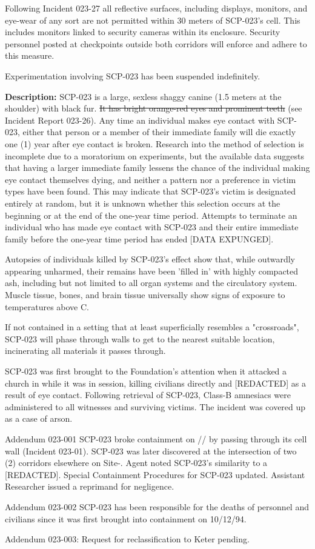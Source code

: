 Following Incident 023-27 all reflective surfaces, including displays, monitors, and eye-wear of any sort are not permitted within 30 meters of SCP-023's cell. This includes monitors linked to security cameras within its enclosure. Security personnel posted at checkpoints outside both corridors will enforce and adhere to this measure.

Experimentation involving SCP-023 has been suspended indefinitely.

\textbf{Description:} SCP-023 is a large, sexless shaggy canine (1.5 meters at the shoulder) with black fur. \sout{It has bright orange-red eyes and prominent teeth} (see Incident Report 023-26). Any time an individual makes eye contact with SCP-023, either that person or a member of their immediate family will die exactly one (1) year after eye contact is broken. Research into the method of selection is incomplete due to a moratorium on experiments, but the available data suggests that having a larger immediate family lessens the chance of the individual making eye contact themselves dying, and neither a pattern nor a preference in victim types have been found. This may indicate that SCP-023's victim is designated entirely at random, but it is unknown whether this selection occurs at the beginning or at the end of the one-year time period. Attempts to terminate an individual who has made eye contact with SCP-023 and their entire immediate family before the one-year time period has ended [DATA EXPUNGED].

Autopsies of individuals killed by SCP-023's effect show that, while outwardly appearing unharmed, their remains have been 'filled in' with highly compacted ash, including but not limited to all organ systems and the circulatory system. Muscle tissue, bones, and brain tissue universally show signs of exposure to temperatures above \degree C.

If not contained in a setting that at least superficially resembles a "crossroads", SCP-023 will phase through walls to get to the nearest suitable location, incinerating all materials it passes through.

SCP-023 was first brought to the Foundation's attention when it attacked a church in  while it was in session, killing  civilians directly and [REDACTED] as a result of eye contact. Following retrieval of SCP-023, Class-B amnesiacs were administered to all witnesses and surviving victims. The incident was covered up as a case of arson.

Addendum 023-001
SCP-023 broke containment on // by passing through its cell wall (Incident 023-01). SCP-023 was later discovered at the intersection of two (2) corridors elsewhere on Site-. Agent  noted SCP-023's similarity to a [REDACTED]. Special Containment Procedures for SCP-023 updated. Assistant Researcher  issued a reprimand for negligence.

Addendum 023-002
SCP-023 has been responsible for the deaths of  personnel and  civilians since it was first brought into containment on 10/12/94.

Addendum 023-003:
Request for reclassification to Keter pending.